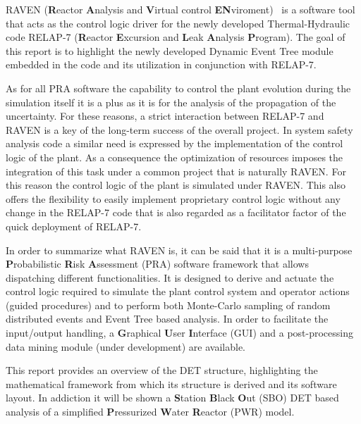 \label{sec:introduction}
RAVEN (\textbf{R}eactor \textbf{A}nalysis and \textbf{V}irtual control \textbf{EN}viroment)~\cite{ravenFY12,mandelliANS2012} is a software tool that acts as the control logic driver for the newly developed Thermal-Hydraulic code RELAP-7  (\textbf{R}eactor \textbf{E}xcursion and \textbf{L}eak \textbf{A}nalysis \textbf{P}rogram). The goal of this report is to highlight the newly developed  Dynamic Event Tree module embedded in the code and its utilization in conjunction with RELAP-7. 

As for all PRA software the capability to control the plant evolution during the simulation itself it is a plus as it is for the analysis of the propagation of the uncertainty. For these reasons, a strict interaction between RELAP-7 and RAVEN is a key of the long-term success of the overall project. In system safety analysis code a similar need is expressed by the implementation of the control logic of the plant. As a consequence the optimization of resources imposes the integration of this task under a common project that is naturally RAVEN. For this reason the control logic of the plant is simulated under RAVEN. This also offers the flexibility to easily implement proprietary control logic  without any change in the RELAP-7 code that is also regarded as a facilitator factor of the quick deployment of RELAP-7.

In order to summarize what RAVEN is, it can be said that it is a multi-purpose \textbf{P}robabilistic \textbf{R}isk \textbf{A}ssessment (PRA) software framework that allows dispatching different functionalities. 
It is designed to derive and actuate the control logic required to simulate the plant control system and operator actions (guided procedures) and to perform both Monte-Carlo sampling of random distributed events and Event Tree based analysis. 
In order to facilitate the input/output handling, a \textbf{G}raphical \textbf{U}ser \textbf{I}nterface (GUI) and a post-processing data mining module (under development) are available.

This report provides an overview of the DET structure, highlighting the mathematical framework from which its structure is derived and its software layout. In addiction it will be shown a \textbf{S}tation \textbf{B}lack \textbf{O}ut (SBO) DET based analysis of a simplified \textbf{P}ressurized \textbf{W}ater \textbf{R}eactor (PWR) model.
\vspace{-5mm}



